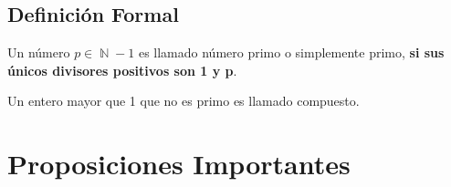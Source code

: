 \documentclass[12pt, fleqn]{report}                             %
\DeclareMathOperator \Naturals  {\mathbb{N}}                     %
\begin{document}
        \subsection*{Definición Formal}

            Un número $p \in \Naturals - {1}$ es llamado número primo o simplemente
            primo, \textbf{si sus únicos divisores positivos son 1 y p}.

            Un entero mayor que 1 que no es primo es llamado compuesto.

         
    \section{Proposiciones Importantes}
\end{document}
